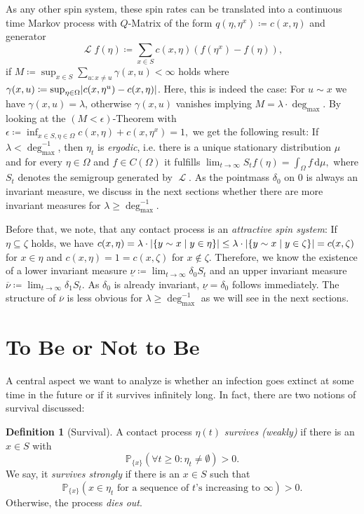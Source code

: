 \documentclass[a4paper,11pt]{amsart}
\theoremstyle{theorem}
\theoremstyle{definition}
\newtheorem{definition}[theorem]{Definition}
\newcommand{\Cont}{C}
\newcommand{\diff}{\,\mathrm{d}}
\renewcommand{\P}{\mathbb{P}}
\DeclareMathOperator{\LGen}{\mathcal{L}}
\DeclarePairedDelimiter\abs{\lvert}{\rvert}%
\begin{document}
As any other spin system, these spin rates can be translated into a continuous time Markov process with $Q$-Matrix of the form $q(\eta, \eta^x) \coloneqq c(x,\eta)$ and generator
$$
\LGen f(\eta) \coloneqq \sum_{x\in S} c(x,\eta) \left( f(\eta^x) - f(\eta) \right),
$$
if $M\coloneqq \sup_{x\in S} \sum_{u:x\neq u} \gamma(x,u) < \infty$ holds where $\gamma(x,u)\coloneqq \sup_{\eta\in\Omega} \abs{ c(x,\eta^u) - c(x,\eta) }$.
Here, this is indeed the case:
For $u\sim x$ we have $\gamma(x,u)=\lambda$, otherwise $\gamma(x,u)$ vanishes implying $M = \lambda \cdot \deg_{\max}$.
By looking at the $(M<\epsilon)$-Theorem with $\epsilon\coloneqq \inf_{x\in S, \eta\in \Omega} c(x,\eta)+ c(x,\eta^x) = 1,$ we get the following result:
If  $\lambda <\deg_{\max}^{-1}$, then $\eta_t$ is \emph{ergodic}, i.e. there is a unique stationary distribution $\mu$ and for every $\eta\in\Omega$ and $f\in \Cont(\Omega)$ it fulfills $\lim_{t\to\infty} S_t f(\eta) = \int_\Omega f \diff \mu,$
where $S_t$ denotes the semigroup generated by $\LGen$.
As the pointmass $\delta_0$ on $0$ is always an invariant measure, we discuss in the next sections whether there are more invariant measures for $\lambda \geq \deg_{\max}^{-1}$.


Before that, we note, that any contact process is an \emph{attractive spin system}: If $\eta \subseteq \zeta$ holds, we have $c(x,\eta) = \lambda \cdot \abs{ \{ y\sim x\mid y\in\eta \}}\leq \lambda \cdot \abs{\{ y\sim x\mid y\in\zeta \}} = c(x,\zeta)$ for $x\in\eta$ and $c(x, \eta) = 1 = c(x,\zeta)$ for $x\notin\zeta$.
Therefore, we know the existence of a lower invariant measure $\underline{\nu}\coloneqq \lim_{t\to\infty} \delta_0 S_t$
and an upper invariant measure $\overline{\nu} \coloneqq \lim_{t\to\infty} \delta_1 S_t$.
As $\delta_0$ is already invariant, $\underline{\nu} = \delta_0$ follows immediately.
The structure of $\overline{\nu}$ is less obvious for $\lambda \geq \deg_{\max}^{-1}$ as we will see in the next sections.

\section{To Be or Not to Be}
A central aspect we want to analyze is whether an infection goes extinct at some time in the future or if it survives infinitely long.
In fact, there are two notions of survival discussed:

\begin{definition}[Survival]
	A contact process $\eta(t)$ \emph{survives (weakly)} if there is an $x\in S$ with $$\P_{\{x\}}(\forall t \geq 0: \eta_t \neq \emptyset) > 0.$$
	We say, it \emph{survives strongly} if there is an $x\in S$ such that  $$\P_{\{ x \}}( x \in \eta_t \text{ for a sequence of $t$'s increasing to $\infty$}) > 0.$$
	Otherwise, the process \emph{dies out}.
\end{definition}
\end{document}
